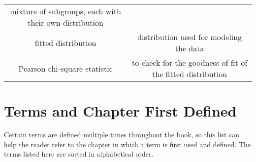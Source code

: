 \documentclass[]{book}
\theoremstyle{definition}
\theoremstyle{definition}
\theoremstyle{definition}
\theoremstyle{remark}
\begin{document}
\begin{longtable}[]{@{}cc@{}}
\begin{minipage}[t]{0.43\columnwidth}
mixture of subgroups, each with their own distribution\strut
\end{minipage}\tabularnewline
\begin{minipage}[t]{0.43\columnwidth}\centering\strut
fitted distribution\strut
\end{minipage} & \begin{minipage}[t]{0.43\columnwidth}\centering\strut
distribution used for modeling the data\strut
\end{minipage}\tabularnewline
\begin{minipage}[t]{0.43\columnwidth}\centering\strut
Pearson chi-square statistic\strut
\end{minipage} & \begin{minipage}[t]{0.43\columnwidth}\centering\strut
to check for the goodness of fit of the fitted distribution\strut
\end{minipage}\tabularnewline
\bottomrule
\end{longtable}

\section{Terms and Chapter First
Defined}\label{terms-and-chapter-first-defined}

Certain terms are defined multiple times throughout the book, so this
list can help the reader refer to the chapter in which a term is first
used and defined. The terms listed here are sorted in alphabetical
order.
\end{document}
